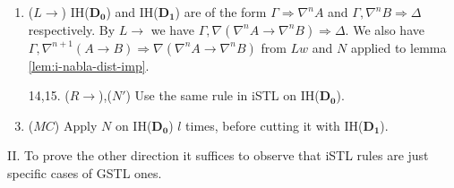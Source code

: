 \begin{enumerate}
	\item ($L\rightarrow$) IH($\mathbf{D_0}$) and IH($\mathbf{D_1}$) are of the form $\Gamma \Rightarrow \nabla^n A$ and $\Gamma , \nabla^n B \Rightarrow \Delta$ respectively. By $L\rightarrow$ we have $\Gamma , \nabla (\nabla^n A \rightarrow \nabla^n B) \Rightarrow \Delta$. We also have $\Gamma , \nabla^{n+1} (A \rightarrow B) \Rightarrow \nabla (\nabla^n A \rightarrow \nabla^n B)$ from $Lw$ and $N$ applied to lemma \ref{lem:i-nabla-dist-imp}.
	
	\item[14,15.] ($R\rightarrow$),($N'$) Use the same rule in iSTL on IH($\mathbf{D_0}$).
	\setcounter{enumi}{15}
	
	\item ($MC$) Apply $N$ on IH($\mathbf{D_0}$) $l$ times, before cutting it with IH($\mathbf{D_1}$).
\end{enumerate}
II. To prove the other direction it suffices to observe that iSTL rules are just specific cases of GSTL ones.
